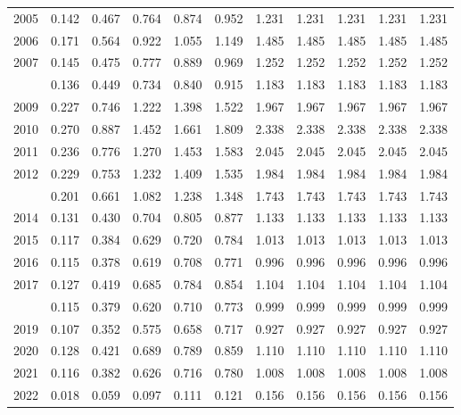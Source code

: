 \documentclass[
]{article}
\begin{document}
\begin{longtable}[t]{lrrrrrrrrrr}
2005 & 0.142 & 0.467 & 0.764 & 0.874 & 0.952 & 1.231 & 1.231 & 1.231 & 1.231 & 1.231\\
2006 & 0.171 & 0.564 & 0.922 & 1.055 & 1.149 & 1.485 & 1.485 & 1.485 & 1.485 & 1.485\\
2007 & 0.145 & 0.475 & 0.777 & 0.889 & 0.969 & 1.252 & 1.252 & 1.252 & 1.252 & 1.252\\
\addlinespace
2008 & 0.136 & 0.449 & 0.734 & 0.840 & 0.915 & 1.183 & 1.183 & 1.183 & 1.183 & 1.183\\
2009 & 0.227 & 0.746 & 1.222 & 1.398 & 1.522 & 1.967 & 1.967 & 1.967 & 1.967 & 1.967\\
2010 & 0.270 & 0.887 & 1.452 & 1.661 & 1.809 & 2.338 & 2.338 & 2.338 & 2.338 & 2.338\\
2011 & 0.236 & 0.776 & 1.270 & 1.453 & 1.583 & 2.045 & 2.045 & 2.045 & 2.045 & 2.045\\
2012 & 0.229 & 0.753 & 1.232 & 1.409 & 1.535 & 1.984 & 1.984 & 1.984 & 1.984 & 1.984\\
\addlinespace
2013 & 0.201 & 0.661 & 1.082 & 1.238 & 1.348 & 1.743 & 1.743 & 1.743 & 1.743 & 1.743\\
2014 & 0.131 & 0.430 & 0.704 & 0.805 & 0.877 & 1.133 & 1.133 & 1.133 & 1.133 & 1.133\\
2015 & 0.117 & 0.384 & 0.629 & 0.720 & 0.784 & 1.013 & 1.013 & 1.013 & 1.013 & 1.013\\
2016 & 0.115 & 0.378 & 0.619 & 0.708 & 0.771 & 0.996 & 0.996 & 0.996 & 0.996 & 0.996\\
2017 & 0.127 & 0.419 & 0.685 & 0.784 & 0.854 & 1.104 & 1.104 & 1.104 & 1.104 & 1.104\\
\addlinespace
2018 & 0.115 & 0.379 & 0.620 & 0.710 & 0.773 & 0.999 & 0.999 & 0.999 & 0.999 & 0.999\\
2019 & 0.107 & 0.352 & 0.575 & 0.658 & 0.717 & 0.927 & 0.927 & 0.927 & 0.927 & 0.927\\
2020 & 0.128 & 0.421 & 0.689 & 0.789 & 0.859 & 1.110 & 1.110 & 1.110 & 1.110 & 1.110\\
2021 & 0.116 & 0.382 & 0.626 & 0.716 & 0.780 & 1.008 & 1.008 & 1.008 & 1.008 & 1.008\\
2022 & 0.018 & 0.059 & 0.097 & 0.111 & 0.121 & 0.156 & 0.156 & 0.156 & 0.156 & 0.156\\*
\end{longtable}
\end{document}
